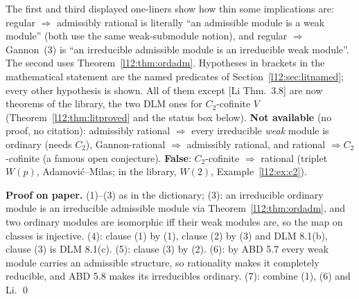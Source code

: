 \begin{dictionary}
The first and third displayed one-liners show how thin some implications are: regular $\Rightarrow$ admissibly rational is
literally ``an admissible module is a weak module'' (both use the same weak-submodule notion), and
regular $\Rightarrow$ Gannon~(3) is ``an irreducible admissible module is an irreducible weak module''. The second uses
Theorem~\ref{l12:thm:ordadm}. Hypotheses in brackets in the mathematical statement are the named predicates of
Section~\ref{l12:sec:litnamed}; every other hypothesis is shown. All of them except [Li Thm.~3.8] are now theorems of the
library, the two DLM ones for $C_2$-cofinite $V$ (Theorem~\ref{l12:thm:litproved} and the status box below). \textbf{Not available} (no proof, no citation): admissibly rational
$\Rightarrow$ every irreducible \emph{weak} module is ordinary (needs $C_2$), Gannon-rational $\Rightarrow$ admissibly
rational, and rational $\Rightarrow C_2$-cofinite (a famous open conjecture). \textbf{False}: $C_2$-cofinite
$\Rightarrow$ rational (triplet $W(p)$, Adamovi\'c--Milas; in the library, $W(2)$, Example~\ref{l12:ex:c2}).
\end{dictionary}

\textbf{Proof on paper.} (1)--(3) as in the dictionary; (3): an irreducible ordinary module is an irreducible admissible
module via Theorem~\ref{l12:thm:ordadm}, and two ordinary modules are isomorphic iff their weak modules are, so the map
on classes is injective. (4): clause (1) by (1), clause (2) by (3) and DLM 8.1(b), clause (3) is DLM 8.1(c). (5): clause (3)
by (2). (6): by ABD 5.7 every weak module carries an admissible structure, so rationality makes it completely reducible,
and ABD 5.8 makes its irreducibles ordinary. (7): combine (1), (6) and Li. \qed


